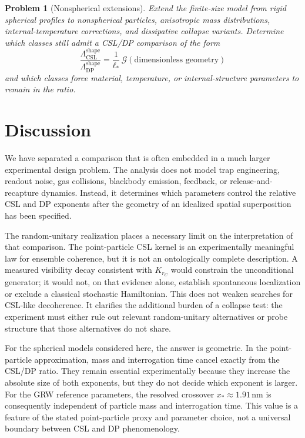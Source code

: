 \documentclass[
  aps,
  prd,
  preprint,
  notitlepage,
  superscriptaddress,
  nofootinbib,
  longbibliography
]{revtex4-2}
\newtheorem{problem}{Problem}
\newcommand{\Krc}{K_{r_C}}
\newcommand{\ellstar}{\ell_*}
\begin{document}
\begin{problem}[Nonspherical extensions]
Extend the finite-size model from rigid spherical profiles to nonspherical particles, anisotropic mass distributions, internal-temperature corrections, and dissipative collapse variants. Determine which classes still admit a CSL/DP comparison of the form
\[
\frac{\Lambda_{\mathrm{CSL}}^{\mathrm{shape}}}
{\Lambda_{\mathrm{DP}}^{\mathrm{shape}}}
=\frac{1}{\ellstar}\,
\mathcal G(\text{dimensionless geometry})
\]
and which classes force material, temperature, or internal-structure parameters to remain in the ratio.
\end{problem}

\section{Discussion}

We have separated a comparison that is often embedded in a much larger experimental design problem. The analysis does not model trap engineering, readout noise, gas collisions, blackbody emission, feedback, or release-and-recapture dynamics. Instead, it determines which parameters control the relative CSL and DP exponents after the geometry of an idealized spatial superposition has been specified.

The random-unitary realization places a necessary limit on the interpretation of that comparison. The point-particle CSL kernel is an experimentally meaningful law for ensemble coherence, but it is not an ontologically complete description. A measured visibility decay consistent with $\Krc$ would constrain the unconditional generator; it would not, on that evidence alone, establish spontaneous localization or exclude a classical stochastic Hamiltonian. This does not weaken searches for CSL-like decoherence. It clarifies the additional burden of a collapse test: the experiment must either rule out relevant random-unitary alternatives or probe structure that those alternatives do not share.

For the spherical models considered here, the answer is geometric. In the point-particle approximation, mass and interrogation time cancel exactly from the CSL/DP ratio. They remain essential experimentally because they increase the absolute size of both exponents, but they do not decide which exponent is larger. For the GRW reference parameters, the resolved crossover $x_*\approx1.91\,\mathrm{nm}$ is consequently independent of particle mass and interrogation time. This value is a feature of the stated point-particle proxy and parameter choice, not a universal boundary between CSL and DP phenomenology.
\end{document}
